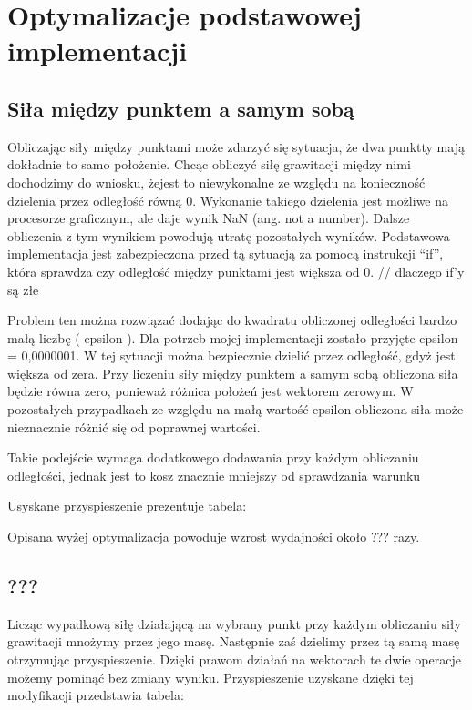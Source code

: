 
\section { Optymalizacje podstawowej implementacji }

\subsection { Siła między punktem a samym sobą }
Obliczając siły między punktami może zdarzyć się sytuacja, że dwa punktty mają dokładnie to samo położenie. Chcąc obliczyć siłę grawitacji między nimi dochodzimy do wniosku, żejest to niewykonalne ze względu na konieczność dzielenia przez odległość równą 0. Wykonanie takiego dzielenia jest możliwe na procesorze graficznym, ale daje wynik NaN (ang. not a number). Dalsze obliczenia z tym wynikiem powodują utratę pozostałych wyników. Podstawowa implementacja jest zabezpieczona przed tą sytuacją za pomocą instrukcji ``if'', która sprawdza czy odległość między punktami jest większa od 0.\linebreak
 // dlaczego if'y są złe

 

Problem ten można rozwiązać dodając do kwadratu obliczonej odległości bardzo małą liczbę ( epsilon ). Dla potrzeb mojej implementacji zostało przyjęte epsilon = 0,0000001. W tej sytuacji można bezpiecznie dzielić przez odległość, gdyż jest większa od zera. Przy liczeniu siły między punktem a samym sobą obliczona siła będzie równa zero, ponieważ różnica położeń jest wektorem zerowym. W pozostałych przypadkach ze względu na małą wartość epsilon obliczona siła może nieznacznie różnić się od poprawnej wartości.

Takie podejście wymaga dodatkowego dodawania przy każdym obliczaniu odległości, jednak jest to kosz znacznie mniejszy od sprawdzania warunku

Usyskane przyspieszenie prezentuje tabela:
\linebreak

Opisana wyżej optymalizacja powoduje wzrost wydajności około ??? razy. 


\subsection { ??? }
Licząc wypadkową siłę działającą na wybrany punkt przy każdym obliczaniu siły grawitacji mnożymy przez jego masę. Następnie zaś dzielimy przez tą samą masę otrzymując przyspieszenie. Dzięki prawom działań na wektorach te dwie operacje możemy pominąć bez zmiany wyniku. Przyspieszenie uzyskane dzięki tej modyfikacji przedstawia tabela:


